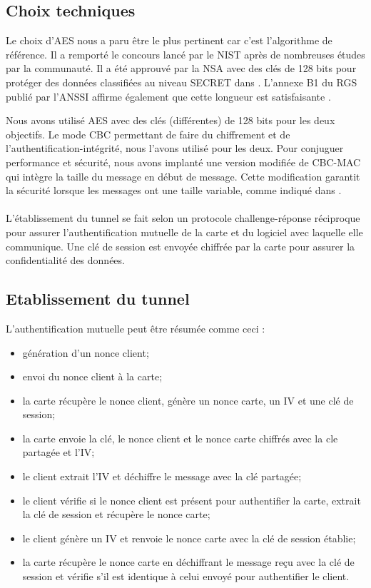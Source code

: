 \documentclass[a4paper,11pt,french]{article}
\begin{document}
\subsection{Choix techniques}
Le choix d'AES nous a paru être le plus pertinent car c'est l'algorithme de 
référence. Il a remporté le concours lancé par le NIST après de nombreuses 
études par la communauté. Il a été approuvé par la NSA avec des clés de 128
bits pour protéger des données classifiées au niveau SECRET dans \cite{NSA}. 
L'annexe B1 du RGS publié par l'ANSSI affirme également que cette longueur est
satisfaisante \cite{RGS ANSSI}. 


Nous avons utilisé AES avec des clés (différentes) de 128 bits pour les deux 
objectifs. Le mode CBC permettant de faire du chiffrement et de 
l'authentification-intégrité, nous l'avons utilisé pour les deux. Pour conjuguer
performance et sécurité, nous avons implanté une version modifiée de CBC-MAC qui
intègre la taille du message en début de message. Cette modification garantit la
sécurité lorsque les messages ont une taille variable, comme indiqué dans 
\cite{CBC-MAC}.


\paragraph{}
L'établissement du tunnel se fait selon un protocole challenge-réponse 
réciproque pour assurer l'authentification mutuelle de la carte et du logiciel 
avec laquelle elle communique. Une clé de session est envoyée chiffrée par la 
carte pour assurer la confidentialité des données.

\subsection{Etablissement du tunnel}
L'authentification mutuelle peut être résumée comme ceci : 
\begin{itemize}
    \item génération d'un nonce client;
    \item envoi du nonce client à la carte;
    \item la carte récupère le nonce client, génère un nonce carte, un IV et une clé
        de session;
    \item la carte envoie la clé, le nonce client et le nonce carte chiffrés avec la
        cle partagée et l'IV;
    \item le client extrait l'IV et déchiffre le message avec la clé partagée;
    \item le client vérifie si le nonce client est présent pour authentifier la 
        carte, extrait la clé de session et récupère le nonce carte;
    \item le client génère un IV et renvoie le nonce carte avec la clé de session 
        établie;
    \item la carte récupère le nonce carte en déchiffrant le message reçu avec 
        la clé de session et vérifie s'il est identique à celui envoyé pour 
        authentifier le client.
\end{itemize}
\end{document}
